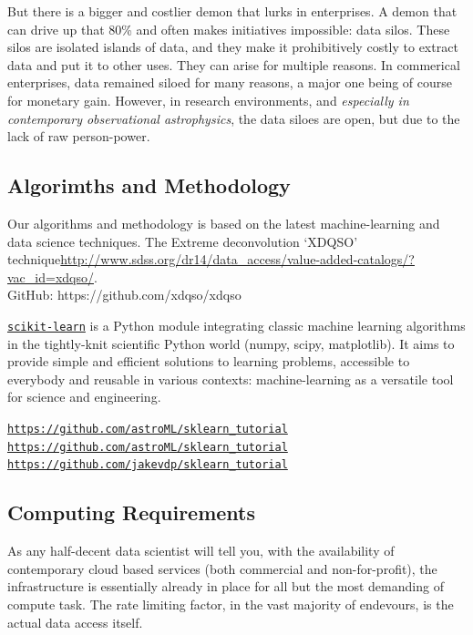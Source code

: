 \documentclass[oneside, a4paper, onecolumn, 11pt]{article}
\begin{document}
\noindent
But there is a bigger and costlier demon that lurks in enterprises. A
demon that can drive up that 80\% and often makes initiatives
impossible: data silos. These silos are isolated islands of data, and
they make it prohibitively costly to extract data and put it to other
uses. They can arise for multiple reasons.
In commerical enterprises, data remained siloed for many reasons, a
major one being of course for monetary gain.  However, in research
environments, and {\it especially in contemporary observational
astrophysics}, the data siloes are open, but due to the lack of raw
person-power. 


\subsection*{Algorimths and Methodology}
Our algorithms and methodology is based on the latest machine-learning and data science techniques. 
The Extreme deconvolution `XDQSO' technique\href{xDQSO}{http://www.sdss.org/dr14/data\_access/value-added-catalogs/?vac\_id=xdqso/}.\\
GitHub: https://github.com/xdqso/xdqso

\noindent
\href{http://ogrisel.github.io/scikit-learn.org/sklearn-tutorial/index.html}{\tt scikit-learn} is a Python module integrating classic machine learning algorithms in the tightly-knit scientific Python world (numpy, scipy, matplotlib). It aims to provide simple and efficient solutions to learning problems, accessible to everybody and reusable in various contexts: machine-learning as a versatile tool for science and engineering. 

\href{https://github.com/astroML/sklearn\_tutorial}{{\tt https://github.com/astroML/sklearn\_tutorial}}\\
\href{https://github.com/jakevdp/PythonDataScienceHandbook}{{\tt https://github.com/astroML/sklearn\_tutorial}}\\
\href{https://github.com/jakevdp/sklearn\_tutorial}{{\tt https://github.com/jakevdp/sklearn\_tutorial}}\\

\subsection*{Computing Requirements}
As any half-decent data scientist will tell you, with the availability of 
contemporary cloud based services (both commercial and non-for-profit), 
the infrastructure is essentially already in place for all but the most demanding
of compute task. The rate limiting factor, in the vast majority of endevours, is 
the actual data access itself. 
\end{document}
